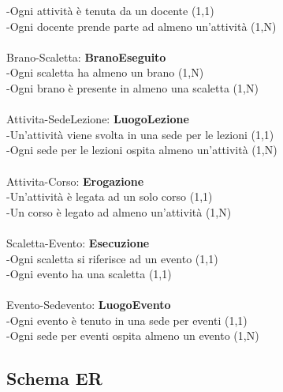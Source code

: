 \documentclass[11pt]{article}
\begin{document}
		-Ogni attività è tenuta da un docente (1,1)\\
		-Ogni docente prende parte ad almeno un'attività (1,N)\\
		\\
		Brano-Scaletta: \textbf{BranoEseguito}\\
		-Ogni scaletta ha almeno un brano (1,N)\\
		-Ogni brano è presente in almeno una scaletta (1,N)\\
		\\
		Attivita-SedeLezione: \textbf{LuogoLezione}\\
		-Un'attività viene svolta in una sede per le lezioni (1,1)\\
		-Ogni sede per le lezioni ospita almeno un'attività (1,N)\\
		\\
		Attivita-Corso: \textbf{Erogazione}\\
		-Un'attività è legata ad un solo corso (1,1)\\
		-Un corso è legato ad almeno un'attività (1,N)\\
		\\
		Scaletta-Evento: \textbf{Esecuzione}\\
		-Ogni scaletta si riferisce ad un evento (1,1)\\
		-Ogni evento ha una scaletta (1,1)\\
		\\
		Evento-Sedevento: \textbf{LuogoEvento}\\
		-Ogni evento è tenuto in una sede per eventi (1,1)\\
		-Ogni sede per eventi ospita almeno un evento (1,N)
	\subsection{Schema ER}
		
\end{document}
